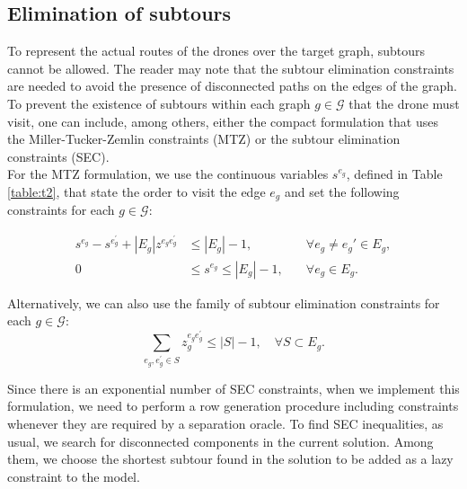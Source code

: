\documentclass[10pt,a4paper]{elsarticle}
\begin{document}
\subsection*{Elimination of subtours}
\noindent
To represent the actual routes of the drones over the target graph, subtours cannot be allowed. The reader may note that the subtour elimination constraints are needed to avoid the presence of disconnected paths on the edges of the graph. To prevent the existence of subtours within each graph $g\in \mathcal G$ that the drone must visit, one can include, among others, either the compact formulation that uses the Miller-Tucker-Zemlin constraints (MTZ) or the subtour elimination constraints (SEC).\\
\noindent
For the MTZ formulation, we use the continuous variables $s^{e_g}$, defined in Table \ref{table:t2}, that state the order to visit the edge $e_g$ and set the following constraints for each $g\in\mathcal G$:

\begin{align}
s^{e_g} - s^{e^\prime_g} + |E_g|z^{e_ge^\prime_g} & \leq |E_g| - 1  , &\quad\forall e_g \neq e_g'\in E_g, \tag{MTZ$_1$} \label{MTZ1}\\
0 & \leq s^{e_g} \leq |E_g| - 1, &\quad\forall e_g\in E_g.\tag{MTZ$_2$}\label{MTZ2}
\end{align}

\noindent
Alternatively, we can also use the family of subtour elimination constraints for each $g\in\mathcal G$:
\begin{equation}\tag{SEC}\label{SEC}
\sum_{e_g, e^\prime_g \in S} z_g^{e_ge^\prime_g} \leq |S| - 1, \quad \forall S\subset E_g.
\end{equation}

\noindent

Since there is an exponential number of SEC constraints, when we implement this formulation, we need to perform a row generation procedure including constraints whenever they are required by a separation oracle. To find SEC inequalities, as usual, we search for disconnected components in the current solution. Among them, we choose the shortest subtour found in the solution to be added as a lazy constraint to the model.\\
\end{document}
